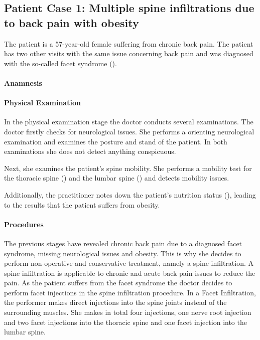 \subsection{Patient Case 1: Multiple spine infiltrations due to back pain with obesity}\label{subsec:patient-a---multiple-spine-infiltrations-due-to-backpain-with-obesity}
The patient is a 57-year-old female suffering from chronic back pain.
The patient has two other visits with the same issue concerning back pain and was diagnosed with the so-called facet syndrome ().

\paragraph{Anamnesis}


\paragraph{Physical Examination}
In the physical examination stage the doctor conducts several examinations.
The doctor firstly checks for neurological issues.
She performs a orienting neurological examination and examines the posture and stand of the patient.
In both examinations she does not detect anything conspicuous.

Next, she examines the patient's spine mobility.
She performs a mobility test for the thoracic spine () and the lumbar spine () and detects mobility issues.


Additionally, the practitioner notes down the patient's nutrition status (), leading to the results that the patient suffers from obesity.

\paragraph{Procedures}

The previous stages have revealed chronic back pain due to a diagnosed facet syndrome, missing neurological issues and obesity.
This is why she decides to perform non-operative and conservative treatment, namely a spine infiltration.
A spine infiltration is applicable to chronic and acute back pain issues to reduce the pain.
As the patient suffers from the facet syndrome the doctor decides to perform facet injections in the spine infiltration procedure.
In a Facet Infiltration, the performer makes direct injections into the spine joints instead of the surrounding muscles.
She makes in total four injections, one nerve root injection and two facet injections into the thoracic spine and one facet injection into the lumbar spine.

